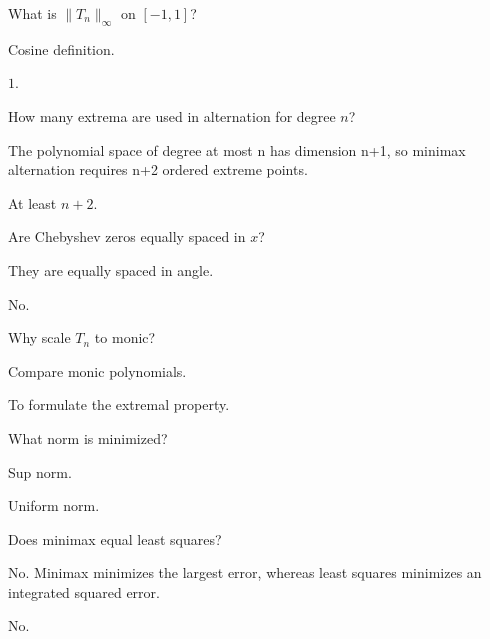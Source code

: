 \begin{exercise}\label{exr:ii22-03}
What is $\|T_n\|_\infty$ on $[-1,1]$?
\end{exercise}
\begin{hint}
Cosine definition.
\end{hint}
\begin{solution}
$1$.
\end{solution}

\begin{exercise}\label{exr:ii22-04}
How many extrema are used in alternation for degree $n$?
\end{exercise}
\begin{hint}
The polynomial space of degree at most n has dimension n+1, so minimax alternation requires n+2 ordered extreme points.
\end{hint}
\begin{solution}
At least $n+2$.
\end{solution}

\begin{exercise}\label{exr:ii22-05}
Are Chebyshev zeros equally spaced in $x$?
\end{exercise}
\begin{hint}
They are equally spaced in angle.
\end{hint}
\begin{solution}
No.
\end{solution}

\begin{exercise}\label{exr:ii22-06}
Why scale $T_n$ to monic?
\end{exercise}
\begin{hint}
Compare monic polynomials.
\end{hint}
\begin{solution}
To formulate the extremal property.
\end{solution}

\begin{exercise}\label{exr:ii22-07}
What norm is minimized?
\end{exercise}
\begin{hint}
Sup norm.
\end{hint}
\begin{solution}
Uniform norm.
\end{solution}

\begin{exercise}\label{exr:ii22-08}
Does minimax equal least squares?
\end{exercise}
\begin{hint}
No. Minimax minimizes the largest error, whereas least squares minimizes an integrated squared error.
\end{hint}
\begin{solution}
No.
\end{solution}


